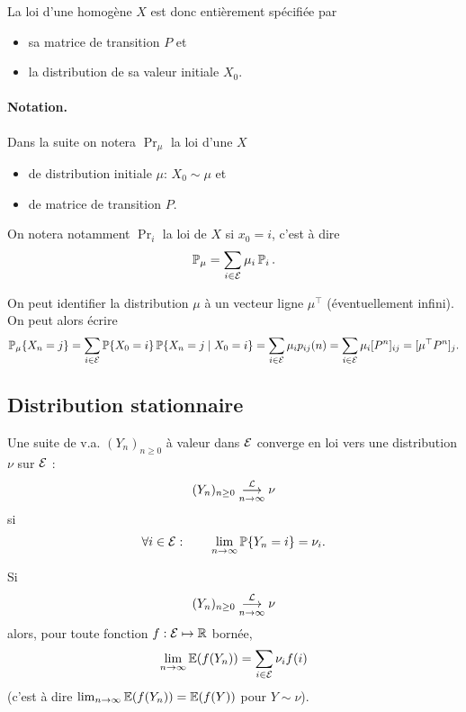 \remark
La loi d'une \cM homogène $X$ est donc entièrement spécifiée par
\begin{itemize}
  \item sa matrice de transition $P$ et
  \item la distribution de sa valeur initiale $X_0$.
\end{itemize}

\paragraph*{Notation.}
Dans la suite on notera $\Pr_\mu$ la loi d'une \cM $X$
\begin{itemize}
  \item de distribution initiale $\mu$: $X_0 \sim \mu$ et
  \item de matrice de transition $P$.
\end{itemize}
On notera notamment $\Pr_i$ la loi de $X$ si $x_0 = i$, c'est à dire
$$
\operatorname{\mathbb{P}}_\mu = \sum_{i \in \mathcal{E}} \mu_i \operatorname{\mathbb{P}}_i.
$$

\remark
On peut identifier la distribution $\mu$ à un vecteur ligne $\mu^\top$ (éventuellement infini). On peut alors écrire
$$
\operatorname{\mathbb{P}}_\mu\{X_n = j\} 
= \sum_{i \in \mathcal{E}} \operatorname{\mathbb{P}}\{X_0 = i\} \operatorname{\mathbb{P}}\{X_n = j \mid X_0 = i\}
= \sum_{i \in \mathcal{E}} \mu_i p_{ij}(n)
= \sum_{i \in \mathcal{E}} \mu_i [P^n]_{ij}
= [\mu^\top P^n]_j.
$$

\subsection{Distribution stationnaire}  

\begin{definition}
  Une suite de v.a. $(Y_n)_{n \geq 0}$ à valeur dans $\mathcal{E}$ converge en loi vers une distribution $\nu$ sur $\mathcal{E}$ :
  $$
  (Y_n)_{n \geq 0} \overset{\mathcal{L}}{\underset{n \to \infty}{\longrightarrow}} \nu
  $$
  si
  $$
  \forall i \in \mathcal{E}: \qquad \lim_{n \to \infty} \operatorname{\mathbb{P}}\{Y_n = i\} = \nu_i.
  $$
\end{definition}

\begin{proposition} \label{prop:convergenceEsperance}
  Si
  $$
  (Y_n)_{n \geq 0} \overset{\mathcal{L}}{\underset{n \to \infty}{\longrightarrow}} \nu
  $$
  alors, pour toute fonction $f : \mathcal{E} \mapsto \mathbb{R}$ bornée, 
  $$
  \lim_{n \to \infty} \operatorname{\mathbb{E}}(f(Y_n)) = \sum_{i \in \mathcal{E}} \nu_i f(i)
  $$
  (c'est à dire $\lim_{n \to \infty} \operatorname{\mathbb{E}}(f(Y_n)) = \operatorname{\mathbb{E}}(f(Y))$ pour $Y \sim \nu$).
\end{proposition}

